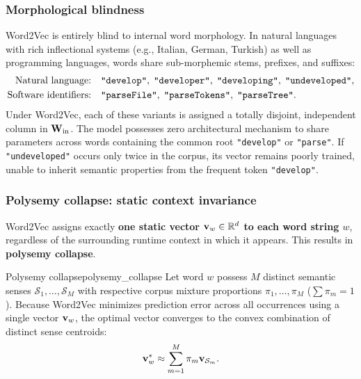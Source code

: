\documentclass[../../../main.tex]{subfiles}
\begin{document}
\subsubsection{Morphological blindness}
\label{subsec:morphological_blindness}

Word2Vec is entirely blind to internal word morphology. In natural languages with rich inflectional systems (e.g., Italian, German, Turkish) as well as programming languages, words share sub-morphemic stems, prefixes, and suffixes:
\begin{align*}
\text{Natural language:} \quad &\text{\texttt{"develop"}}, \; \text{\texttt{"developer"}}, \; \text{\texttt{"developing"}}, \; \text{\texttt{"undeveloped"}}, \\
\text{Software identifiers:} \quad &\text{\texttt{"parseFile"}}, \; \text{\texttt{"parseTokens"}}, \; \text{\texttt{"parseTree"}}.
\end{align*}
Under Word2Vec, each of these variants is assigned a totally disjoint, independent column in $\mathbf{W}_{\text{in}}$. The model possesses zero architectural mechanism to share parameters across words containing the common root \texttt{"develop"} or \texttt{"parse"}. If \texttt{"undeveloped"} occurs only twice in the corpus, its vector remains poorly trained, unable to inherit semantic properties from the frequent token \texttt{"develop"}.

\subsubsection{Polysemy collapse: static context invariance}
\label{subsec:polysemy_collapse}

Word2Vec assigns exactly \textbf{one static vector $\mathbf{v}_w \in \mathbb{R}^d$ to each word string $w$}, regardless of the surrounding runtime context in which it appears. This results in \textbf{polysemy collapse}.

\begin{definition}{Polysemy collapse}{polysemy_collapse}
Let word $w$ possess $M$ distinct semantic senses $\mathcal{S}_1, \dots, \mathcal{S}_M$ with respective corpus mixture proportions $\pi_1, \dots, \pi_M$ ($\sum \pi_m = 1$). Because Word2Vec minimizes prediction error across all occurrences using a single vector $\mathbf{v}_w$, the optimal vector converges to the convex combination of distinct sense centroids:
\begin{equation}
\label{eq:polysemy_convex_combination}
\mathbf{v}_w^* \approx \sum_{m=1}^M \pi_m \mathbf{v}_{\mathcal{S}_m}.
\end{equation}
\end{definition}
\end{document}
